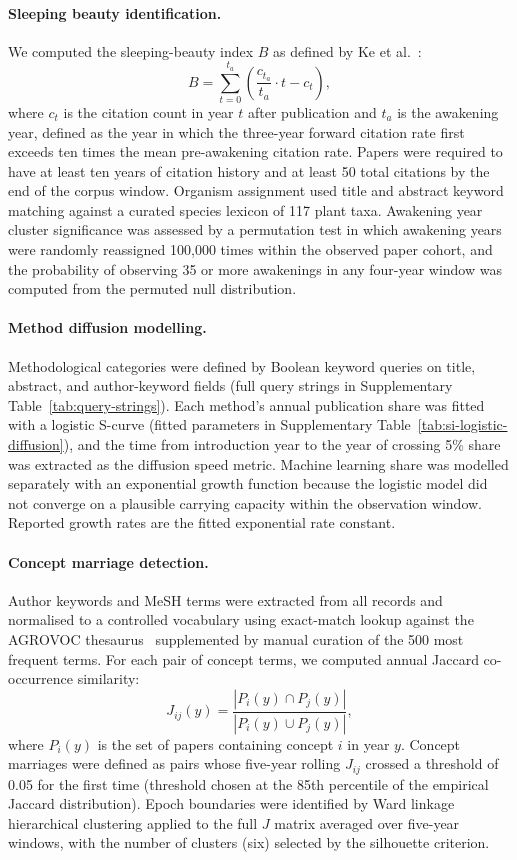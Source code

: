 \paragraph{Sleeping beauty identification.}
We computed the sleeping-beauty index $B$ as defined by Ke et al.~\cite{ke2015sleeping}:
\[
  B = \sum_{t=0}^{t_a} \left( \frac{c_{t_a}}{t_a} \cdot t - c_t \right),
\]
where $c_t$ is the citation count in year $t$ after publication and $t_a$ is
the awakening year, defined as the year in which the three-year forward
citation rate first exceeds ten times the mean pre-awakening citation rate.
Papers were required to have at least ten years of citation history and at
least 50 total citations by the end of the corpus window.
Organism assignment used title and abstract keyword matching against a
curated species lexicon of 117 plant taxa.
Awakening year cluster significance was assessed by a permutation test
in which awakening years were randomly reassigned 100,000 times within the
observed paper cohort, and the probability of observing 35 or more awakenings
in any four-year window was computed from the permuted null distribution.

\paragraph{Method diffusion modelling.}
Methodological categories were defined by Boolean keyword queries on title,
abstract, and author-keyword fields (full query strings in Supplementary
Table~\ref{tab:query-strings}).
Each method's annual publication share was fitted with a logistic
S-curve (fitted parameters in Supplementary
Table~\ref{tab:si-logistic-diffusion}), and the time from introduction year to the year of crossing 5\%
share was extracted as the diffusion speed metric.
Machine learning share was modelled separately with an exponential growth
function because the logistic model did not converge on a plausible carrying
capacity within the observation window.
Reported growth rates are the fitted exponential rate constant.

\paragraph{Concept marriage detection.}
Author keywords and MeSH terms were extracted from all records and
normalised to a controlled vocabulary using exact-match lookup against
the AGROVOC thesaurus~\cite{caracciolo2013} supplemented by manual curation of
the 500 most frequent terms.
For each pair of concept terms, we computed annual Jaccard co-occurrence
similarity:
\[
  J_{ij}(y) = \frac{|P_i(y) \cap P_j(y)|}{|P_i(y) \cup P_j(y)|},
\]
where $P_i(y)$ is the set of papers containing concept $i$ in year $y$.
Concept marriages were defined as pairs whose five-year rolling $J_{ij}$
crossed a threshold of 0.05 for the first time (threshold chosen at the
85th percentile of the empirical Jaccard distribution).
Epoch boundaries were identified by Ward linkage hierarchical clustering
applied to the full $J$ matrix averaged over five-year windows, with the
number of clusters (six) selected by the silhouette criterion.

